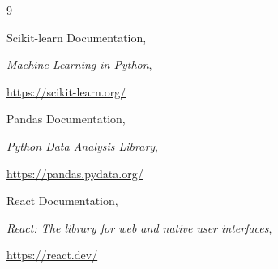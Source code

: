 \documentclass[12pt,a4paper]{report}
\begin{document}
\begin{thebibliography}{9}


Scikit-learn Documentation,

\emph{Machine Learning in Python},

\url{https://scikit-learn.org/}



Pandas Documentation,

\emph{Python Data Analysis Library},

\url{https://pandas.pydata.org/}



React Documentation,

\emph{React: The library for web and native user interfaces},

\url{https://react.dev/}

\end{thebibliography}
\end{document}
